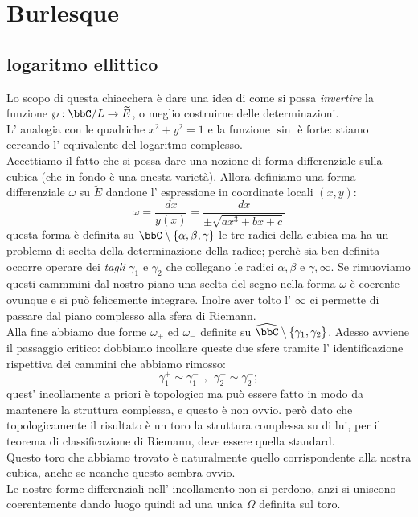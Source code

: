 \chapter{Burlesque}

\section{logaritmo ellittico}
Lo scopo di questa chiacchera è dare una idea di come si possa {\it invertire} la funzione $\wp: \bbC/L \rar \widetilde{E}$, o meglio costruirne delle determinazioni.\\
L' analogia con le quadriche $x^2+y^2=1$ e la funzione $\sin$ è forte: stiamo cercando l' equivalente del logaritmo complesso.\\
Accettiamo il fatto che si possa dare una nozione di forma differenziale sulla cubica (che in fondo è una onesta varietà). Allora definiamo una forma differenziale $\omega$ su $\widetilde{E}$ dandone l' espressione in coordinate locali $(x,y)$:
$$
\omega=\frac{dx}{y(x)}=\frac{dx}{\pm\sqrt{ax^3+bx+c}}
$$
questa forma è definita su $\bbC\setminus\{\alpha, \beta, \gamma\}$ le tre radici della cubica ma ha un problema di scelta della determinazione della radice; perchè sia ben definita occorre operare dei {\it tagli} $\gamma_1$ e $\gamma_2$ che collegano le radici $\alpha,\beta$ e $\gamma,\infty$. Se rimuoviamo questi cammmini dal nostro piano una scelta del segno nella forma $\omega$ è coerente ovunque e si può felicemente integrare. Inolre aver tolto l' $\infty$ ci permette di passare dal piano complesso alla sfera di Riemann.\\
Alla fine abbiamo due forme $\omega_+$ ed $\omega_-$ definite su $\widehat{\bbC}\setminus\{\gamma_1,\gamma_2\}$. Adesso avviene il passaggio critico: dobbiamo incollare queste due sfere tramite l' identificazione rispettiva dei cammini che abbiamo rimosso:
$$
\gamma_1^+\sim \gamma_1^-\ \ , \ \ \gamma_2^+\sim\gamma_2^-;
$$
quest' incollamente a priori è topologico ma può essere fatto in modo da mantenere la struttura complessa, e questo è non ovvio. però dato che topologicamente il risultato è un toro la struttura complessa su di lui, per il teorema di classificazione di Riemann, deve essere quella standard.\\
Questo toro che abbiamo trovato è naturalmente quello corrispondente alla nostra cubica, anche se neanche questo sembra ovvio.\\
Le nostre forme differenziali nell' incollamento non si perdono, anzi si uniscono coerentemente dando luogo quindi ad una unica $\Omega$ definita sul toro.\\
